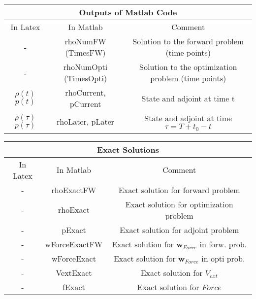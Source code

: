 \documentclass[11pt, a4paper]{article}
\theoremstyle{definition}
\begin{document}
		\begin{table}[h!]
		\begin{tabular}{||c | c | c ||} 
		\hline
		\multicolumn{3}{||c||}{Outputs of Matlab Code}\\
		\hline
		In Latex & In Matlab & Comment\\
		\hline
		- & rhoNumFW (TimesFW) & Solution to the forward problem (time points)\\
    	\hline
    	- & rhoNumOpti (TimesOpti) & Solution to the optimization problem (time points)\\
        \hline
        $\rho(t)$ $p(t)$ & rhoCurrent, pCurrent & State and adjoint at time t\\
        \hline
        $\rho(\tau)$ $p(\tau)$ & rhoLater, pLater & State and adjoint at time $\tau=T+t_0 -t$\\
        \hline
        \hline
        \end{tabular}
        \end{table}

		\begin{table}[h!]
		\begin{tabular}{||c | c | c ||} 
		\hline
		\multicolumn{3}{||c||}{Exact Solutions}\\
		\hline
		In Latex & In Matlab & Comment\\
		\hline
        - & rhoExactFW & Exact solution for forward problem\\
        \hline
        - & rhoExact & Exact solution for optimization problem\\
        \hline
        - & pExact & Exact solution for adjoint problem\\
        \hline
        - & wForceExactFW & Exact solution for $\mathbf w_{Force}$ in forw. prob.\\
        \hline
        - & wForceExact & Exact solution for $\mathbf w_{Force}$ in opti prob.\\
        \hline
        - & VextExact & Exact solution for $V_{ext}$ \\
        \hline
        - & fExact & Exact solution for $Force$ \\
        \hline
        \hline
	\end{tabular}

\end{table}
\end{document}
